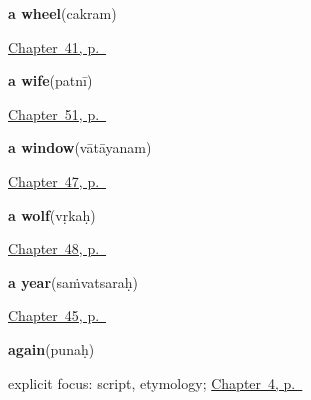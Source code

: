 \noindent\begin{minipage}[t]{\linewidth}
\raggedright
\textbf{a wheel}\enspace\emph{}\enspace(cakram)\par
\footnotesize \hyperref[ch:sa-things-people-make]{Chapter~41, p.~\pageref*{ch:sa-things-people-make}}
\end{minipage}\par\smallskip

\noindent\begin{minipage}[t]{\linewidth}
\raggedright
\textbf{a wife}\enspace\emph{}\enspace(patnī)\par
\footnotesize \hyperref[ch:sa-family-more]{Chapter~51, p.~\pageref*{ch:sa-family-more}}
\end{minipage}\par\smallskip

\noindent\begin{minipage}[t]{\linewidth}
\raggedright
\textbf{a window}\enspace\emph{}\enspace(vātāyanam)\par
\footnotesize \hyperref[ch:sa-parts-of-a-house]{Chapter~47, p.~\pageref*{ch:sa-parts-of-a-house}}
\end{minipage}\par\smallskip

\noindent\begin{minipage}[t]{\linewidth}
\raggedright
\textbf{a wolf}\enspace\emph{}\enspace(vṛkaḥ)\par
\footnotesize \hyperref[ch:sa-more-animals]{Chapter~48, p.~\pageref*{ch:sa-more-animals}}
\end{minipage}\par\smallskip

\noindent\begin{minipage}[t]{\linewidth}
\raggedright
\textbf{a year}\enspace\emph{}\enspace(saṁvatsaraḥ)\par
\footnotesize \hyperref[ch:sa-times-of-the-day]{Chapter~45, p.~\pageref*{ch:sa-times-of-the-day}}
\end{minipage}\par\smallskip

\noindent\begin{minipage}[t]{\linewidth}
\raggedright
\textbf{again}\enspace\emph{}\enspace(punaḥ)\par
\footnotesize explicit focus: script, etymology; \hyperref[ch:farewells]{Chapter~4, p.~\pageref*{ch:farewells}}
\end{minipage}\par\smallskip

